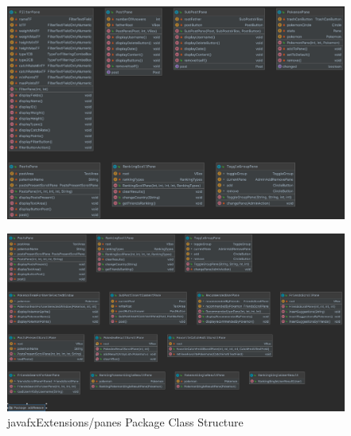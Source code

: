 \begin{figure}[H]
	\centering
	\includegraphics[width=\textwidth]{img/javafx_panes_package.png}
\end{figure}
\begin{figure}[H]
	\centering
	\includegraphics[width=\textwidth]{img/javafx_panes_package2.png}
	\caption{javafxExtensions/panes Package Class Structure}
\end{figure}
